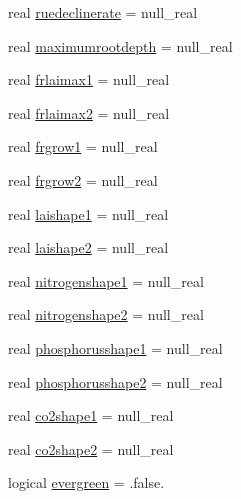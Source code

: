 \begin{DoxyCompactItemize}
\item 
real \mbox{\hyperlink{structmodulevegetation_1_1t__growthdatabase_a223f62b0a3269bd83a7f4cd7a1f6007e}{ruedeclinerate}} = null\+\_\+real
\item 
real \mbox{\hyperlink{structmodulevegetation_1_1t__growthdatabase_a82cd4a3b44aa23acadc92b2575e8f376}{maximumrootdepth}} = null\+\_\+real
\item 
real \mbox{\hyperlink{structmodulevegetation_1_1t__growthdatabase_a38e6fd1f9c680905641b6f06449e7aa8}{frlaimax1}} = null\+\_\+real
\item 
real \mbox{\hyperlink{structmodulevegetation_1_1t__growthdatabase_aab9c9f78049d961b1b6cec8e371e7b1e}{frlaimax2}} = null\+\_\+real
\item 
real \mbox{\hyperlink{structmodulevegetation_1_1t__growthdatabase_a2f079843e9d7a15464ab4b4ce0ca323a}{frgrow1}} = null\+\_\+real
\item 
real \mbox{\hyperlink{structmodulevegetation_1_1t__growthdatabase_a8bf8e590306bcee0e6ea7c212d849973}{frgrow2}} = null\+\_\+real
\item 
real \mbox{\hyperlink{structmodulevegetation_1_1t__growthdatabase_a8c3994fdd429ef747c4af28933e770c6}{laishape1}} = null\+\_\+real
\item 
real \mbox{\hyperlink{structmodulevegetation_1_1t__growthdatabase_ac8ac908791e83e5b725336f7da05138e}{laishape2}} = null\+\_\+real
\item 
real \mbox{\hyperlink{structmodulevegetation_1_1t__growthdatabase_ab53fdee4ba6782a4705e6e0f7af3c389}{nitrogenshape1}} = null\+\_\+real
\item 
real \mbox{\hyperlink{structmodulevegetation_1_1t__growthdatabase_a6f68e4405a857affad2b5cd2da33fb25}{nitrogenshape2}} = null\+\_\+real
\item 
real \mbox{\hyperlink{structmodulevegetation_1_1t__growthdatabase_a736d08a5784ea4d5f0b7515237ae0b14}{phosphorusshape1}} = null\+\_\+real
\item 
real \mbox{\hyperlink{structmodulevegetation_1_1t__growthdatabase_afc0bf059e992f97aa413dc2da9883171}{phosphorusshape2}} = null\+\_\+real
\item 
real \mbox{\hyperlink{structmodulevegetation_1_1t__growthdatabase_a88e49d12ffc2466775466818c1de42fd}{co2shape1}} = null\+\_\+real
\item 
real \mbox{\hyperlink{structmodulevegetation_1_1t__growthdatabase_a781e0fb2aeaacd1fa114f96ac6490c1b}{co2shape2}} = null\+\_\+real
\item 
logical \mbox{\hyperlink{structmodulevegetation_1_1t__growthdatabase_a76c6eaaa3252d0204f05e04d9c21ab55}{evergreen}} = .false.

\end{DoxyCompactItemize}
